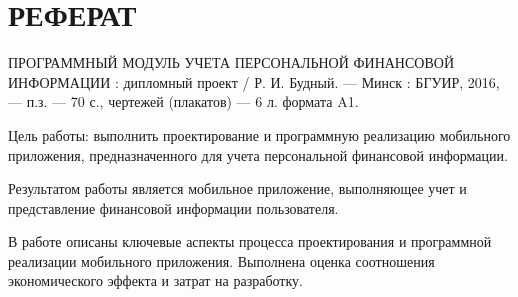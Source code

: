 \section*{РЕФЕРАТ}
\thispagestyle{empty}

ПРОГРАММНЫЙ МОДУЛЬ УЧЕТА ПЕРСОНАЛЬНОЙ ФИНАНСОВОЙ ИНФОРМАЦИИ :
дипломный проект / Р. И. Будный. --- Минск : БГУИР, 2016, --- п.з. ---
{\color{red} 70 с.}, чертежей (плакатов) --- 6 л. формата A1.

{\color{red}
Цель работы:
выполнить проектирование и программную реализацию мобильного приложения,
предназначенного для учета персональной финансовой информации.

Результатом работы является мобильное приложение, выполняющее учет и
представление финансовой информации пользователя.

В работе описаны ключевые аспекты процесса проектирования
и программной реализации мобильного приложения.
Выполнена оценка соотношения экономического эффекта и затрат на разработку.
}

\pagebreak
